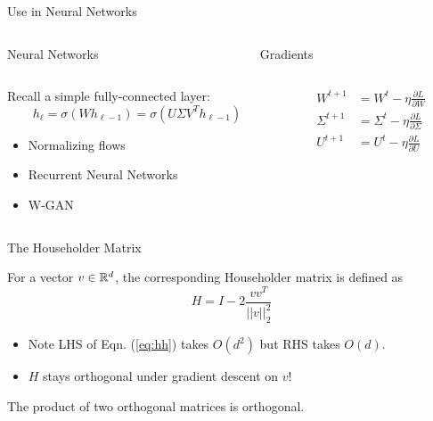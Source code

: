 \begin{frame}{Use in Neural Networks}
	\begin{columns}
		\begin{column}{0.47\textwidth}
			\alert{Neural Networks}
		\end{column}
		\begin{column}{0.47\textwidth}
			\alert{Gradients}
		\end{column}
	\end{columns}
	\vspace{1em}

	\begin{columns}
		\begin{column}{0.47\textwidth}
			Recall a simple fully-connected layer:
			\begin{equation*}
 				h_{\ell} = \sigma (Wh_{\ell-1}) = \sigma \left( U\Sigma V^T h_{\ell-1}\right)
			\end{equation*}

			\begin{itemize}
				\item Normalizing flows
				\item Recurrent Neural Networks
				\item W-GAN
			\end{itemize}
		\end{column}

		\begin{column}{0.47\textwidth}
			\begin{align*}	
				W^{t+1} &= W^{t} - \eta \frac{\partial L}{\partial W}\\
				\Sigma^{t+1} &= \Sigma^{t} - \eta \frac{\partial L}{\partial \Sigma}\\
				U^{t+1} &= U^{t} - \eta \frac{\partial L}{\partial U}\\
			\end{align*}
		\end{column}
	\end{columns}
\end{frame}

\begin{frame}{The Householder Matrix}
	\begin{definition}
 		For a vector $v \in \mathbb{R}^{d}$, the corresponding Householder matrix
 		is defined as
 		\begin{equation}\label{eq:hh}
 			H = I - 2\frac{v v^T}{||v||^2_2}
 		\end{equation}
	\end{definition}

	\begin{itemize}
		\item Note LHS of Eqn. (\ref{eq:hh}) takes $O(d^2)$ but RHS takes $O(d)$.
		\item $H$ stays orthogonal under gradient descent on $v$!
	\end{itemize}

	\begin{lemma}
		The product of two orthogonal matrices is orthogonal. 
	\end{lemma}
\end{frame}

